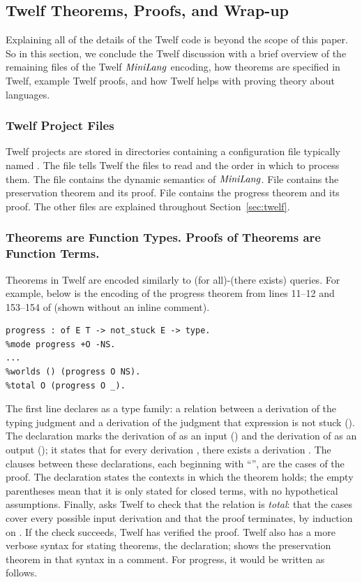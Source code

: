 \subsection{Twelf Theorems, Proofs, and Wrap-up}
Explaining all of the details of the Twelf code is
beyond the scope of this paper.
So in this section, we conclude the Twelf discussion with a brief
overview of the remaining files of the Twelf $\mathit{MiniLang}$ encoding,
how theorems are specified in Twelf, example Twelf proofs,
and how Twelf helps with proving theory about languages.


\subsubsection{Twelf Project Files}
Twelf projects are stored in directories containing a configuration
file typically named .
The  file tells Twelf the files to read
and the order in which to process them.
The  file contains the dynamic semantics
of $\mathit{MiniLang}$.
File  contains the preservation theorem
and its proof.
File  contains the progress theorem
and its proof.
The other files are explained throughout Section~\ref{sec:twelf}.

\subsubsection{Theorems are Function Types. Proofs of Theorems are Function Terms.}
Theorems in Twelf are encoded similarly to
(for all)-(there exists) queries.
For example, below is the encoding of the progress theorem
from lines 11--12 and 153--154 of 
(shown without an inline comment).

\begin{verbatim}
progress : of E T -> not_stuck E -> type.
%mode progress +O -NS.
...
%worlds () (progress O NS).
%total O (progress O _).
\end{verbatim}

The first line declares  as a type family:
a relation between a derivation of the typing judgment
 and a derivation of the judgment that expression
 is not stuck ().
The  declaration marks the derivation 
of  as an input (\code{+}) and the derivation
 of  as an output (\code{-});
it states that for every derivation , there exists
a derivation .
The clauses between these declarations, each beginning with
``\code{- :}'', are the cases of the proof.
The  declaration states the contexts in which
the theorem holds; the empty parentheses mean that it is only
stated for closed terms, with no hypothetical assumptions.
Finally,  asks Twelf to check that the relation
is \emph{total}:
that the cases cover every possible input derivation
and that the proof terminates, by induction on .
If the check succeeds, Twelf has verified the proof.
Twelf also has a more verbose syntax for stating theorems,
the  declaration; 
shows the preservation theorem in that syntax in a comment.
For progress, it would be written as follows.

